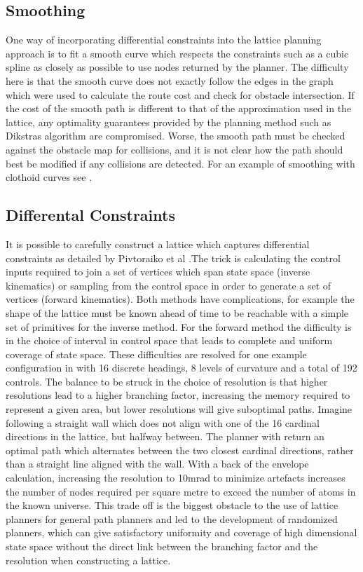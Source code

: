 \documentclass[11pt]{article} %
\begin{document}
\subsection{Smoothing}
One way of incorporating differential constraints into the lattice planning approach is to fit a smooth curve which respects the constraints such as a cubic spline as closely as possible to use nodes returned by the planner. The difficulty here is that the smooth curve does not exactly follow the edges in the graph which were used to calculate the route cost and check for obstacle intersection. If the cost of the smooth path is different to that of the approximation used in the lattice, any optimality guarantees provided by the planning method such as Dikstras algorithm are compromised. Worse, the smooth path must be checked against the obstacle map for collisions, and it is not clear how the path should best be modified if any collisions are detected. For an example of smoothing with clothoid curves see \cite{Lundberg2017} \cite{Walton2005}.

\subsection{Differental Constraints}
It is possible to carefully construct a lattice which captures differential constraints as detailed by Pivtoraiko et al \cite{Pivtoraiko2009}.The trick is calculating the control inputs required to join a set of vertices which span state space (inverse kinematics) or sampling from the control space in order to generate a set of vertices (forward kinematics). Both methods have complications, for example the shape of the lattice must be known ahead of time to be reachable with a simple set of primitives for the inverse method. For the forward method the difficulty is in the choice of interval in control space that leads to complete and uniform coverage of state space. These difficulties are resolved for one example configuration in \cite{Pivtoraiko2009} with 16 discrete headings, 8 levels of curvature and a total of 192 controls. The balance to be struck in the choice of resolution is that higher resolutions lead to a higher branching factor, increasing the memory required to represent a given area, but lower resolutions will give suboptimal paths. Imagine following a straight wall which does not align with one of the 16 cardinal directions in the lattice, but halfway between. The planner with return an optimal path which alternates between the two closest cardinal directions, rather than a straight line aligned with the wall. With a back of the envelope calculation, increasing the resolution to 10mrad to minimize artefacts increases the number of nodes required per square metre to exceed the number of atoms in the known universe. This trade off is the biggest obstacle to the use of lattice planners for general path planners and led to the development of randomized planners, which can give satisfactory uniformity and coverage of high dimensional state space without the direct link between the branching factor and the resolution when constructing a lattice.   
\end{document}
